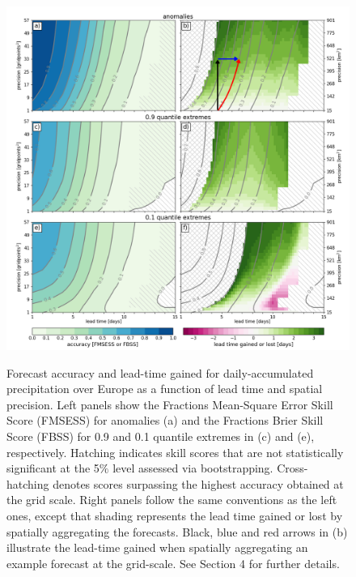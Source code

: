 \documentclass[preprint,12pt,authoryear]{elsarticle}
\begin{document}
\newpage
\begin{figure}[t]
  \noindent\includegraphics[scale=0.45]{fig_01.png}\\
  \caption{Forecast accuracy and lead-time gained for daily-accumulated precipitation over Europe as a function of lead time and spatial precision. Left panels show the Fractions Mean-Square Error Skill Score (FMSESS) for anomalies (a) and the Fractions Brier Skill Score (FBSS) for 0.9 and 0.1 quantile extremes in (c) and (e), respectively. Hatching indicates skill scores that are not statistically significant at the 5$\%$ level assessed via bootstrapping. Cross-hatching denotes scores surpassing the highest accuracy obtained at the grid scale. Right panels follow the same conventions as the left ones, except that shading represents the lead time gained or lost by spatially aggregating the forecasts. Black, blue and red arrows in (b) illustrate the lead-time gained when spatially aggregating an example forecast at the grid-scale. See Section 4 for further details.}\label{f1}
\end{figure}
\end{document}
